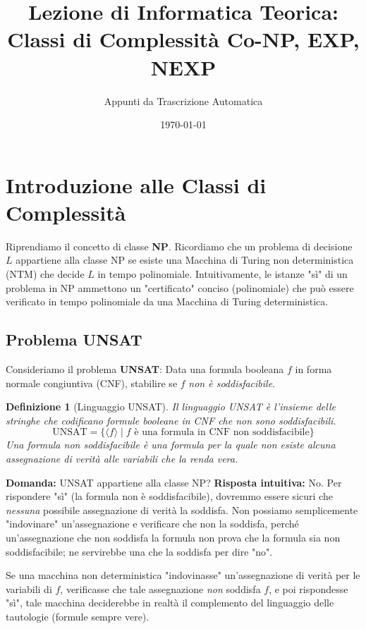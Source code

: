 \documentclass[a4paper]{article}
\title{Lezione di Informatica Teorica: \\ Classi di Complessità Co-NP, EXP, NEXP}
\author{Appunti da Trascrizione Automatica}
\date{\today}
\newtheorem{definition}{Definizione}
\begin{document}
\maketitle
\tableofcontents
\newpage

\section{Introduzione alle Classi di Complessità}

Riprendiamo il concetto di classe \textbf{NP}. Ricordiamo che un problema di decisione $L$ appartiene alla classe NP se esiste una Macchina di Turing non deterministica (NTM) che decide $L$ in tempo polinomiale. Intuitivamente, le istanze "sì" di un problema in NP ammettono un "certificato" conciso (polinomiale) che può essere verificato in tempo polinomiale da una Macchina di Turing deterministica.

\subsection{Problema UNSAT}

Consideriamo il problema \textbf{UNSAT}:
Data una formula booleana $f$ in forma normale congiuntiva (CNF), stabilire se $f$ \textit{non è soddisfacibile}.

\begin{definition}[Linguaggio UNSAT]
Il linguaggio UNSAT è l'insieme delle stringhe che codificano formule booleane in CNF che non sono soddisfacibili.
\[
\text{UNSAT} = \{ \langle f \rangle \mid f \text{ è una formula in CNF non soddisfacibile} \}
\]
Una formula non soddisfacibile è una formula per la quale non esiste alcuna assegnazione di verità alle variabili che la renda vera.
\end{definition}

\textbf{Domanda:} UNSAT appartiene alla classe NP?
\textbf{Risposta intuitiva:} No. Per rispondere "sì" (la formula non è soddisfacibile), dovremmo essere sicuri che \textit{nessuna} possibile assegnazione di verità la soddisfa. Non possiamo semplicemente "indovinare" un'assegnazione e verificare che non la soddisfa, perché un'assegnazione che non soddisfa la formula non prova che la formula sia non soddisfacibile; ne servirebbe una che la soddisfa per dire "no".

Se una macchina non deterministica "indovinasse" un'assegnazione di verità per le variabili di $f$, verificasse che tale assegnazione \textit{non} soddisfa $f$, e poi rispondesse "sì", tale macchina deciderebbe in realtà il complemento del linguaggio delle tautologie (formule sempre vere).
\end{document}
